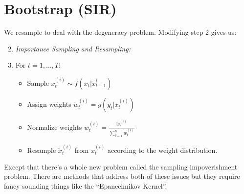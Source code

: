 \documentclass{article}
\begin{document}
\section{Bootstrap (SIR)}

We resample to deal with the degeneracy problem. Modifying step 2 gives us:

\begin{enumerate}
\setcounter{enumi}{1}
\item \textit{Importance Sampling and Resampling:}
\item[] For $t=1,\dots,T$:
\begin{itemize}
\item[] Sample $x_t^{(i)} \sim f(x_t|\widetilde{x}_{t-1}^{i})$
\item[] Assign weights $\widetilde{w}_t^{(i)} = g(y_t|x_t^{(i)})$
\item[] Normalize weights $w_t^{(i)} = \frac{\widetilde{w}_t^{(i)}}{\sum_{i=1}^{n} \widetilde{w}_t^{(i)}}$
\item[] Resample $\widetilde{x}_t^{(i)}$ from $x_t^{(i)}$ according to the weight distribution.
\end{itemize}
\end{enumerate}


Except that there's a whole new problem called the sampling impoverishment problem. There are methods that address both of these issues but they require fancy sounding things like the ``Epanechnikov Kernel''.






\end{document}
